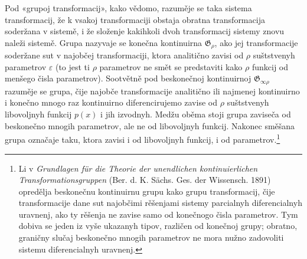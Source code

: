 \documentclass[11pt]{article}
\providecommand{\G}{\mathfrak G}
\providecommand{\eps}{\varepsilon}
\begin{document}
Pod «grupoj transformacij», kako vědomo, razuměje se taka sistema transformacij, že k vsakoj transformaciji obstaja obratna transformacija soderžana v sistemě, i že složenje kakihkoli dvoh transformacij sistemy znovu naleži sistemě. Grupa nazyvaje se konečna kontinuirna \(\G_\rho\), ako jej transformacije soderžane sut v najobčej transformaciji, ktora analitično zavisi od \(\rho\) suštstvenyh parametrov \(\eps\) (to jest ti \(\rho\) parametrov ne smět se predstaviti kako \(\rho\) funkcij od menšego čisla parametrov). Sootvětně pod beskonečnoj kontinuirnoj \(\G_{\infty\rho}\) razuměje se grupa, čije najobče transformacije analitično ili najmenej kontinuirno i konečno mnogo raz kontinuirno diferencirujemo zavise od \(\rho\) suštstvenyh libovoljnyh funkcij \(p(x)\) i jih izvodnyh. Medžu oběma stoji grupa zaviseča od beskonečno mnogih parametrov, ale ne od libovoljnyh funkcij. Nakonec směšana grupa označaje taku, ktora zavisi i od libovoljnyh funkcij, i od parametrov.\footnote{Li v \emph{Grundlagen für die Theorie der unendlichen kontinuierlichen Transformationsgruppen} (Ber. d. K. Sächs. Ges. der Wissensch. 1891) opredělja beskonečnu kontinuirnu grupu kako grupu transformacij, čije transformacije dane sut najobčimi rěšenjami sistemy parcialnyh diferencialnyh uravnenj, ako ty rěšenja ne zavise samo od konečnogo čisla parametrov. Tym dobiva se jeden iz vyše ukazanyh tipov, različen od konečnoj grupy; obratno, graničny slučaj beskonečno mnogih parametrov ne mora nužno zadovoliti sistemu diferencialnyh uravnenj.}
\end{document}
